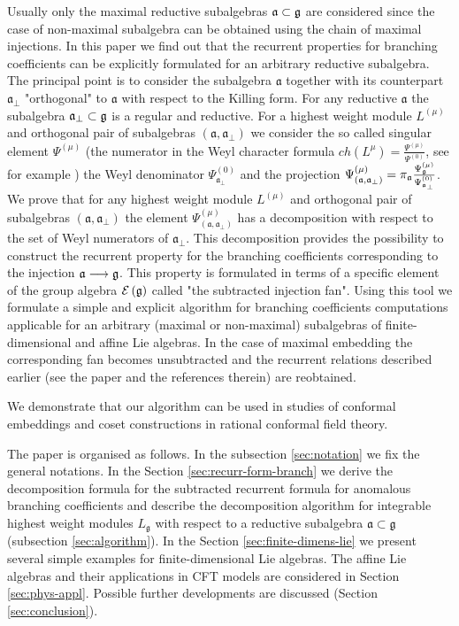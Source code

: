 \documentclass[12pt]{iopart}
\theoremstyle{definition}
\newcommand{\af}{\mathfrak{a}}
\newcommand{\afb}{\mathfrak{a}_{\bot}}
\begin{document}
Usually only the maximal reductive subalgebras $\frak{a} \subset \frak{g} $ are considered since the case of non-maximal subalgebra
can be obtained using the chain of maximal injections. In this paper we find out that the recurrent properties
for branching coefficients can be explicitly formulated for an arbitrary reductive subalgebra.
The principal point is to consider the subalgebra $\af$ together with its
counterpart $\afb$ "orthogonal" to $\af$ with respect to the Killing form.
For any reductive $\af$ the subalgebra $\afb \subset \frak{g} $ is a regular and reductive.
For a highest weight module $L^{\left( \mu \right)}$ and orthogonal pair of subalgebras
$\left(  \af, \afb \right)$ we consider
the so called singular element $\Psi^{\left( \mu \right)}$ (the numerator
in the Weyl character formula
$ch\left( L^{\mu }\right) =\frac{\Psi ^{\left( \mu \right) }}{\Psi ^{\left( 0\right) }}$, see for example \cite{humphreys1978rth})
the Weyl denominator $\Psi ^{\left( 0\right) }_{\afb}$ and the projection
$\Psi ^{\left( \mu \right) }_{\left(  \af, \afb \right)}=\pi_{\af}\frac{\Psi ^{\left( \mu \right) }_{\frak{g}}}{\Psi ^{\left( 0\right) }_{\afb}}$.
We prove that for any highest weight module $L^{\left( \mu \right)}$ and orthogonal pair of subalgebras
$\left(  \af, \afb \right)$ the element $\Psi ^{\left( \mu \right) }_{\left(  \af, \afb \right)}$ has a decomposition with respect to
the set of Weyl numerators of $\afb$.
This decomposition provides the possibility to construct the recurrent property for the branching coefficients corresponding
to the injection $\frak{a} \longrightarrow \frak{g} $.
This property is formulated in
terms of a specific element of the group algebra $\mathcal{E}\left( \frak{g} \right)$ called "the subtracted injection fan".
Using this tool we formulate a simple and
explicit algorithm for branching coefficients computations applicable for an arbitrary (maximal or non-maximal)
subalgebras of finite-dimensional and affine Lie algebras.
In the case of maximal embedding the corresponding fan becomes unsubtracted and the recurrent relations described
earlier (see the paper \cite{ilyin812pbc}
and the references therein) are reobtained.

We demonstrate that our algorithm can be used in studies of conformal embeddings and coset constructions
in rational conformal field theory.

The paper is organised as follows. In the subsection \ref{sec:notation}  we fix the general notations.
In the Section \ref{sec:recurr-form-branch} we derive the decomposition formula for
the subtracted recurrent formula for anomalous
branching coefficients and describe the decomposition algorithm for integrable highest weight modules
$L_{\mathfrak{g}}$ with respect to a reductive subalgebra $\mathfrak{a}\subset \mathfrak{g}$
(subsection \ref{sec:algorithm}). In the Section \ref{sec:finite-dimens-lie} we present several
simple examples for finite-dimensional Lie algebras. The affine Lie algebras and their applications in
CFT models are considered in Section \ref{sec:phys-appl}.
Possible further developments are discussed (Section \ref{sec:conclusion}).
\end{document}
